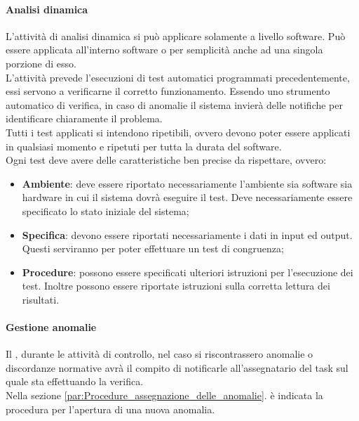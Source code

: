 			\paragraph{Analisi dinamica} %
			\label{par:analisi_dinamica}
			L'attività di analisi dinamica si può applicare solamente a livello software. Può essere applicata all'interno software o per semplicità anche ad una singola porzione di esso.\\
			L'attività prevede l'esecuzioni di test automatici programmati precedentemente, essi servono a verificarne il corretto funzionamento. Essendo uno strumento automatico di verifica, in caso di anomalie il sistema invierà delle notifiche per identificare chiaramente il problema.\\
			Tutti i test applicati si intendono ripetibili, ovvero devono poter essere applicati in qualsiasi momento e ripetuti per tutta la durata del software.\\
			Ogni test deve avere delle caratteristiche ben precise da rispettare, ovvero:
			\begin{itemize}
				\item \textbf{Ambiente}: deve essere riportato necessariamente l'ambiente sia software sia hardware in cui il sistema dovrà eseguire il test. Deve necessariamente essere specificato lo stato iniziale del sistema;
				\item \textbf{Specifica}: devono essere riportati necessariamente i dati in input ed output. Questi serviranno per poter effettuare un test di congruenza;
				\item \textbf{Procedure}: possono essere specificati ulteriori istruzioni per l'esecuzione dei test. Inoltre possono essere riportate istruzioni sulla corretta lettura dei risultati.
			\end{itemize}

			\paragraph{Gestione anomalie}
			Il \roleVerifier, durante le attività di controllo, nel caso si riscontrassero anomalie o discordanze normative avrà il compito di notificarle all'assegnatario del task sul quale sta effettuando la verifica.\\
			Nella sezione \ref{par:Procedure_assegnazione_delle_anomalie}. è indicata la procedura per l'apertura di una nuova anomalia.

